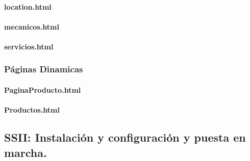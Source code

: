 \documentclass{article}
\begin{document}
\paragraph{location.html}
\paragraph{mecanicos.html}
\paragraph{servicios.html}
\subsubsection{Páginas Dinamicas}
\paragraph{PaginaProducto.html}
\paragraph{Productos.html}



\subsection{SSII: Instalación y configuración y puesta en marcha.} 
\label{subsection:Sistemas}
\end{document}
